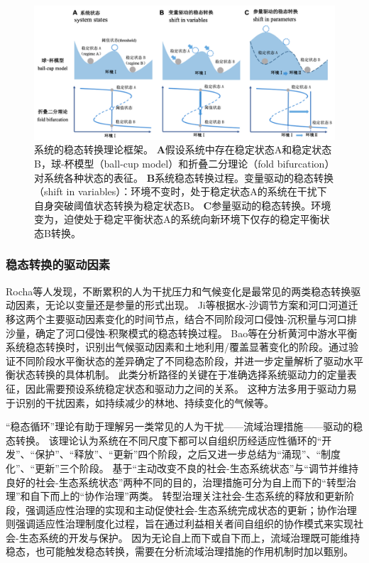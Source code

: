 \begin{figure}[!ht] %
    \centering
    \includegraphics[width=\textwidth]{img/ch1/ch1_regime_shift.png}
    \caption[系统的稳态转换理论框架]{系统的稳态转换理论框架。
    \textbf{A}假设系统中存在稳定状态A和稳定状态B，球-杯模型（ball-cup model）和折叠二分理论（fold bifurcation）对系统各种状态的表征。
    \textbf{B}系统稳态转换过程。变量驱动的稳态转换（shift in variables）：环境不变时，处于稳定状态A的系统在干扰下自身突破阈值状态转换为稳定状态B。
    \textbf{C}参量驱动的稳态转换。环境变为，迫使处于稳定平衡状态A的系统向新环境下仅存的稳定平衡状态B转换。}\label{ch1:fig:regime_shift}
\end{figure}

\subsubsection{稳态转换的驱动因素}

Rocha等人发现，不断累积的人为干扰压力和气候变化是最常见的两类稳态转换驱动因素，无论以变量还是参量的形式出现\cite{rocha2018}。
Ji等根据水-沙调节方案和河口河道迁移这两个主要驱动因素变化的时间节点，结合不同阶段河口侵蚀-沉积量与河口排沙量，确定了河口侵蚀-积聚模式的稳态转换过程\cite{ji2018}。
Bao等在分析黄河中游水平衡系统稳态转换时，识别出气候驱动因素和土地利用/覆盖显著变化的阶段。通过验证不同阶段水平衡状态的差异确定了不同稳态阶段，并进一步定量解析了驱动水平衡状态转换的具体机制\cite{bao2019}。
此类分析路径的关键在于准确选择系统驱动力的定量表征，因此需要预设系统稳定状态和驱动力之间的关系。
这种方法多用于驱动力易于识别的干扰因素，如持续减少的林地、持续变化的气候等。

“稳态循环”理论有助于理解另一类常见的人为干扰——流域治理措施——驱动的稳态转换。
该理论认为系统在不同尺度下都可以自组织历经适应性循环的“开发”、“保护”、“释放”、“更新”四个阶段\cite{gunderson2001}，之后又进一步总结为“涌现”、“制度化”、“更新”三个阶段。
基于“主动改变不良的社会-生态系统状态”与“调节并维持良好的社会-生态系统状态”两种不同的目的，治理措施可分为自上而下的“转型治理”和自下而上的“协作治理”两类\cite{song2019}。
转型治理关注社会-生态系统的释放和更新阶段，强调适应性治理的实现和主动促使社会-生态系统完成状态的更新；协作治理则强调适应性治理制度化过程，旨在通过利益相关者间自组织的协作模式来实现社会-生态系统的开发与保护\cite{song2019}。
因为无论自上而下或自下而上，流域治理既可能维持稳态，也可能触发稳态转换，需要在分析流域治理措施的作用机制时加以甄别。

